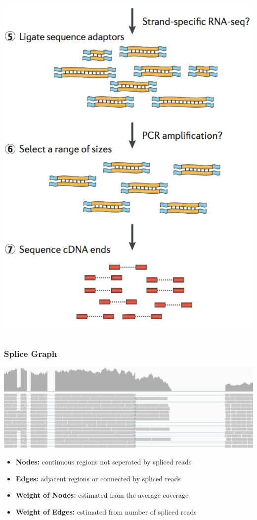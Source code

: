 {\begin{columns}[c]
	 \includegraphics[width=\textwidth]{figures/seq2.pdf}
	\end{columns}

	\vspace{0.25cm}
}

\frame
{
	\frametitle{Splice Graph}
	\includegraphics[width=\textwidth]{figures/reference.pdf}
	\vspace{0.2cm}
	
	\vspace{-0.4cm}
	
	\vspace{0.2cm}
	\begin{itemize}
	\item<3-> {\bf Nodes:} continuous regions not seperated by spliced reads
	\item<3-> {\bf Edges:} adjacent regions or connected by spliced reads
	\item<3-> {\bf Weight of Nodes:} estimated from the average coverage
	\item<3-> {\bf Weight of Edges:} estimated from number of spliced reads
	\end{itemize}
}


